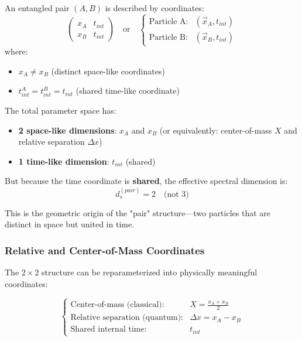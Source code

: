 \begin{definition}
An entangled pair $(A, B)$ is described by coordinates:
\begin{equation}
    \begin{pmatrix}
        x_A & t_{int} \\
        x_B & t_{int}
    \end{pmatrix}
    \quad \text{or} \quad
    \begin{cases}
        \text{Particle A:} & (\vec{x}_A, t_{int}) \\
        \text{Particle B:} & (\vec{x}_B, t_{int})
    \end{cases}
\end{equation}
where:
\begin{itemize}
    \item $x_A \neq x_B$ (distinct space-like coordinates)
    \item $t_{int}^A = t_{int}^B = t_{int}$ (shared time-like coordinate)
\end{itemize}
\end{definition}

The total parameter space has:
\begin{itemize}
    \item \textbf{2 space-like dimensions}: $x_A$ and $x_B$ (or equivalently: center-of-mass $X$ and relative separation $\Delta x$)
    \item \textbf{1 time-like dimension}: $t_{int}$ (shared)
\end{itemize}

But because the time coordinate is \textbf{shared}, the effective spectral dimension is:
\begin{equation}
    d_s^{(pair)} = 2 \quad \text{(not 3)}
\end{equation}

This is the geometric origin of the "pair" structure—two particles that are distinct in space but united in time.

\subsubsection{Relative and Center-of-Mass Coordinates}

The $2 \times 2$ structure can be reparameterized into physically meaningful coordinates:

\begin{equation}
    \begin{cases}
        \text{Center-of-mass (classical):} & X = \frac{x_A + x_B}{2} \\
        \text{Relative separation (quantum):} & \Delta x = x_A - x_B \\
        \text{Shared internal time:} & t_{int}
    \end{cases}
\end{equation}


